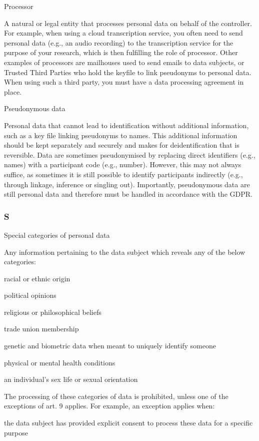 \documentclass[
]{book}
\begin{document}
Processor

A natural or legal entity that processes personal data on behalf of the
controller. For example, when using a cloud transcription service, you often
need to send personal data (e.g., an audio recording) to the transcription
service for the purpose of your research, which is then fulfilling the role
of processor. Other examples of processors are mailhouses used to send emails
to data subjects, or Trusted Third Parties who hold the keyfile to link
pseudonyms to personal data. When using such a third party, you must have a
data processing agreement in place.

Pseudonymous data

Personal data that cannot lead to identification without additional information,
such as a key file linking pseudonyms to names. This additional information should be kept separately and securely
and makes for deidentification that is reversible. Data are sometimes pseudonymised by replacing direct identifiers
(e.g., names) with a participant code (e.g., number). However, this may not always suffice, as sometimes it is still
possible to identify participants indirectly (e.g., through linkage, inference or singling out). Importantly, pseudonymous
data are still personal data and therefore must be handled in accordance with the GDPR.

\hypertarget{s}{%
\subsubsection{S}\label{s}}

Special categories of personal data

Any information pertaining to the data subject which reveals any of the below categories:

racial or ethnic origin

political opinions

religious or philosophical beliefs

trade union membership

genetic and biometric data when meant to uniquely identify someone

physical or mental health conditions

an individual's sex life or sexual orientation

The processing of these categories of data is
prohibited, unless one of the exceptions of
art. 9 applies.
For example, an exception applies when:

the data subject has provided explicit consent to process these data for a specific purpose
\end{document}
